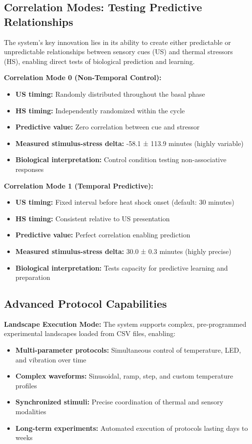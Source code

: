 \documentclass[11pt,a4paper]{article}
\begin{document}
\subsection{Correlation Modes: Testing Predictive Relationships}

The system's key innovation lies in its ability to create either predictable or unpredictable relationships between sensory cues (US) and thermal stressors (HS), enabling direct tests of biological prediction and learning.

\textbf{Correlation Mode 0 (Non-Temporal Control):}
\begin{itemize}
\item \textbf{US timing:} Randomly distributed throughout the basal phase
\item \textbf{HS timing:} Independently randomized within the cycle
\item \textbf{Predictive value:} Zero correlation between cue and stressor
\item \textbf{Measured stimulus-stress delta:} -58.1 ± 113.9 minutes (highly variable)
\item \textbf{Biological interpretation:} Control condition testing non-associative responses
\end{itemize}

\textbf{Correlation Mode 1 (Temporal Predictive):}
\begin{itemize}
\item \textbf{US timing:} Fixed interval before heat shock onset (default: 30 minutes)
\item \textbf{HS timing:} Consistent relative to US presentation
\item \textbf{Predictive value:} Perfect correlation enabling prediction
\item \textbf{Measured stimulus-stress delta:} 30.0 ± 0.3 minutes (highly precise)
\item \textbf{Biological interpretation:} Tests capacity for predictive learning and preparation
\end{itemize}

\subsection{Advanced Protocol Capabilities}

\textbf{Landscape Execution Mode:}
The system supports complex, pre-programmed experimental landscapes loaded from CSV files, enabling:
\begin{itemize}
\item \textbf{Multi-parameter protocols:} Simultaneous control of temperature, LED, and vibration over time
\item \textbf{Complex waveforms:} Sinusoidal, ramp, step, and custom temperature profiles
\item \textbf{Synchronized stimuli:} Precise coordination of thermal and sensory modalities
\item \textbf{Long-term experiments:} Automated execution of protocols lasting days to weeks
\end{itemize}
\end{document}
